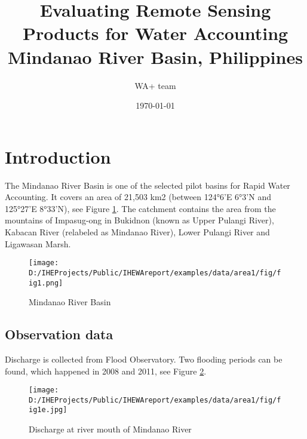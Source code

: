 \documentclass[oneside,openany]{article}%
\title{Evaluating Remote Sensing Products for Water Accounting\\Mindanao River Basin, Philippines}%
\author{WA+ team}%
\date{\today}%
\begin{document}
%
\normalsize%
\newpage%
\pagestyle{FirstPage}%
\clearpage%
\cleardoublepage%
\clearpage%
%
\setcounter{page}{1}%
\setcounter{section}{0}%
\setcounter{figure}{0}%
\setcounter{table}{0}%
\pagestyle{PreambleHeader}%
\newpage%
\tableofcontents%
\clearpage%
\cleardoublepage%
\newpage%
\listoffigures%
\clearpage%
\cleardoublepage%
\newpage%
\listoftables%
\clearpage%
\cleardoublepage%
\clearpage%
%
\setcounter{page}{1}%
\setcounter{section}{0}%
\setcounter{figure}{0}%
\setcounter{table}{0}%
\pagestyle{SectionHeader}%
\newpage%
\RaggedRight%
\section{Introduction}%
\label{sec:Introduction}%
The Mindanao River Basin is one of the selected pilot basins for Rapid Water Accounting. It covers an area of 21,503 km2 (between 124°6’E 6°3’N and 125°27’E 8°33’N), see Figure \ref{figure:fig1}.%
\linebreak%
The catchment contains the area from the mountains of Impasug-ong in Bukidnon (known as Upper Pulangi River), Kabacan River (relabeled as Mindanao River), Lower Pulangi River and Ligawasan Marsh.%
\linebreak%


\begin{figure}[H]%
\centering%
\texttt{[image: D:/IHEProjects/Public/IHEWAreport/examples/data/area1/fig/fig1.png]}%
\caption{Mindanao River Basin}%
\label{figure:fig1}%
\end{figure}

%
\subsection{Observation data}%
\label{subsec:Observationdata}%
Discharge is collected from Flood Observatory. Two flooding periods can be found, which happened in 2008 and 2011, see Figure \ref{figure:fig2}.%
\linebreak%


\begin{figure}[H]%
\centering%
\texttt{[image: D:/IHEProjects/Public/IHEWAreport/examples/data/area1/fig/fig1e.jpg]}%
\caption{Discharge at river mouth of Mindanao River}%
\label{figure:fig2}%
\end{figure}

%
\end{document}
